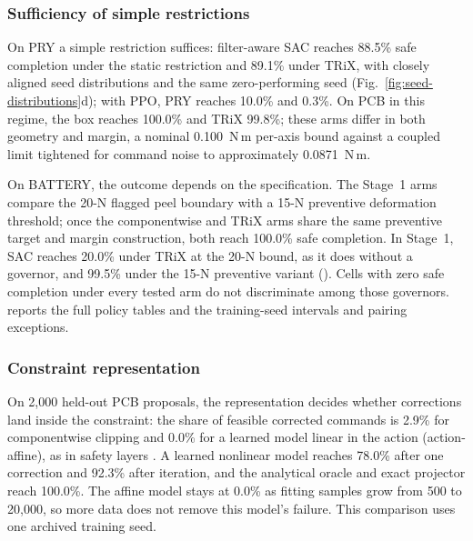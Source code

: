 \documentclass[12pt]{article}
\begin{document}
\subsubsection{Sufficiency of simple restrictions}
\label{sec:sufficient-results}
On PRY a simple restriction suffices: filter-aware SAC reaches 88.5\% safe completion under the static
restriction and 89.1\% under TRiX, with closely aligned seed distributions and
the same zero-performing seed (Fig.~\ref{fig:seed-distributions}d); with PPO, PRY reaches 10.0\% and 0.3\%. On PCB in
this regime, the box reaches 100.0\% and TRiX 99.8\%; these arms differ in both
geometry and margin, a nominal 0.100~N\,m per-axis bound against a coupled
limit tightened for command noise to approximately 0.0871~N\,m.

On BATTERY, the outcome depends on the specification. The Stage~1 arms compare the 20-N flagged peel boundary with a 15-N preventive deformation threshold;
once the componentwise and TRiX arms share the same preventive target and
margin construction, both reach 100.0\% safe completion. In Stage~1, SAC reaches 20.0\% under TRiX at the 20-N bound, as it does without a governor, and 99.5\% under the 15-N preventive variant (). Cells with zero safe completion under every tested arm do not discriminate
among those governors.  reports the full policy tables and
 the training-seed intervals and pairing exceptions.

\subsubsection{Constraint representation}
\label{sec:representation-results}
On 2,000 held-out PCB proposals, the representation decides whether corrections land inside the constraint: the share of feasible corrected
commands is 2.9\% for componentwise clipping and 0.0\% for a learned model
linear in the action (action-affine), as in safety layers \cite{ref21}. A
learned nonlinear model reaches 78.0\% after one correction and 92.3\% after
iteration, and the analytical oracle and exact projector reach 100.0\%. The
affine model stays at 0.0\% as fitting samples grow from 500 to 20,000, so more
data does not remove this model's failure. This
comparison uses one archived training seed.
\end{document}
